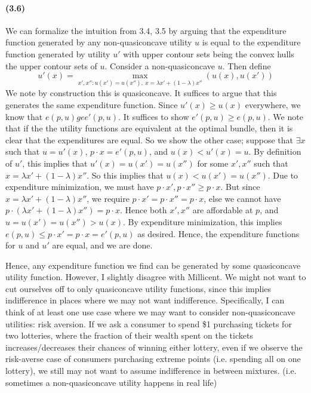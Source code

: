 \documentclass[10pt,letter]{article}
\begin{document}
\paragraph{(3.6)}
We can formalize the intuition from 3.4, 3.5 by arguing that the expenditure function generated by any non-quasiconcave utility $u$ is equal to the expenditure function generated by utility $u'$ with upper contour sets being the convex hulls the upper contour sets of $u$. Consider a non-quasiconcave $u$. Then define \[ u'(x) = \max_{x', x'': u(x') = u(x''), \ x = \lambda x' + (1-\lambda)x''}(u(x), u(x')) \] We note by construction this is quasiconcave. It suffices to argue that this generates the same expenditure function. Since $u'(x) \ge u(x)$ everywhere, we know that $e(p, u) ge e'(p,u)$. It suffices to show $e'(p, u) \ge e(p,u)$. We note that if the the utility functions are equivalent at the optimal bundle, then it is clear that the expenditures are equal. So we show the other case; suppose that $\exists x$ such that $u = u'(x)$, $p\cdot x = e'(p,u)$, and $u(x) < u'(x) = u$. By definition of $u'$, this implies that $u'(x) = u(x') = u(x'')$ for some $x', x''$ such that $x = \lambda x' + (1-\lambda)x''$. So this implies that $u(x) < u(x') = u(x'')$. Due to expenditure minimization, we must have $p \cdot x', p\cdot x'' \ge p \cdot x$. But since $x = \lambda x' + (1-\lambda)x''$, we require $p \cdot x' = p\cdot x'' = p \cdot x$, else we cannot have $p \cdot (\lambda x' + (1-\lambda)x'') = p\cdot x$. Hence both $x', x''$ are affordable at $p$, and $u = u(x') = u(x'') > u(x)$. By expenditure minimization, this implies $e(p,u) \le p \cdot x' = p \cdot x = e'(p,u) $ as desired. Hence, the expenditure functions for $u$ and $u'$ are equal, and we are done.

Hence, any expenditure function we find can be generated by some quasiconcave utility function. However, I slightly disagree with Millicent. We might not want to cut ourselves off to only quasiconcave utility functions, since this implies indifference in places where we may not want indifference. Specifically, I can think of at least one use case where we may want to consider non-quasiconcave utilities: risk aversion. If we ask a consumer to spend \$1 purchasing tickets for two lotteries, where the fraction of their wealth spent on the tickets increases/decreases their chances of winning either lottery, even if we observe the risk-averse case of consumers purchasing extreme points (i.e. spending all on one lottery), we still may not want to assume indifference in between mixtures. (i.e. sometimes a non-quasiconcave utility happens in real life)
\end{document}
